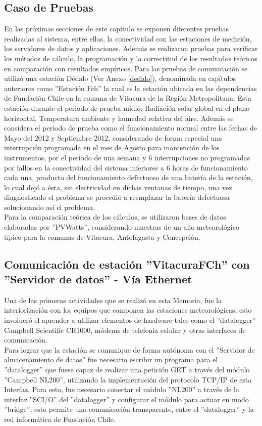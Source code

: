 \subsection{Caso de Pruebas}
En las próximas secciones de este capítulo se exponen diferentes pruebas realizadas al sistema, entre ellas, la conectividad con las estaciones de medición, los servidores de datos y aplicaciones. Además se realizaron pruebas para verificar los métodos de cálculo, la programación y la correctitud de los resultados teóricos en comparación con resultados empíricos. Para las pruebas de comunicación se utilizó una estación Dédalo (Ver Anexo \ref{dedalo}), denominada en capítulos anteriores como ''Estación Fch'' la cual es la estación ubicada en las dependencias de Fundación Chile en la comuna de Vitacura de la Región Metropolitana. Esta estación durante el periodo de prueba midió: Radiación solar global en el plano horizontal, Temperatura ambiente y humedad relativa del aire. Además se considera el periodo de prueba como el funcionamiento normal entre las fechas de Mayo del 2012 y Septiembre 2012, considerando de forma especial una interrupción programada en el mes de Agosto para mantención de los instrumentos, por el periodo de una semana y 6 interrupciones no programadas por fallos en la conectividad del sistema inferiores a 6 horas de funcionamiento cada una, producto del funcionamiento defectuoso de una batería de la estación, lo cual dejó a ésta, sin electricidad en dichas ventanas de tiempo, una vez diagnosticado el problema se procedió a reemplazar la batería defectuosa solucionando así el problema.\\
Para la comparación teórica de los cálculos, se utilizaron bases de datos elaboradas por ''PVWatts'', considerando muestras de un año meteorológico típico para la comunas de Vitacura, Antofagasta y Concepción.  
 
\subsection{Comunicación de estación ''VitacuraFCh'' con ''Servidor de datos'' - Vía Ethernet}
Una de las primeras actividades que se realizó en esta Memoria, fue la interiorización con los equipos que componen las estaciones meteorológicas, esto involucró el aprender a utilizar elementos de hardware tales como el ''datalogger'' Campbell Scientific CR1000, módems de telefonía celular y otras interfaces de comunicación.\\
Para lograr que la estación se comunique de forma autónoma con el ''Servidor de almacenamiento de datos'' fue necesario escribir un programa para el ''datalogger'' que fuese capaz de realizar una petición GET a través del módulo ''Campbell NL200'', utilizando la implementación del protocolo TCP/IP de esta Interfaz. Para esto, fue necesario conectar el módulo ''NL200'' a través de la interfaz ''SCI/O'' del ''datalogger'' y configurar el módulo para actuar en modo ''bridge'', esto permite una comunicación transparente, entre el ''datalogger'' y la red informática de Fundación Chile.

